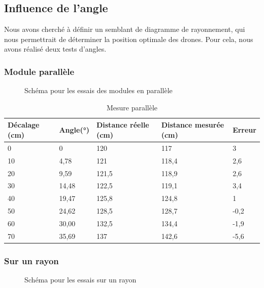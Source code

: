 \documentclass[11pt,a4paper]{article}
\begin{document}
\subsection{Influence de l'angle}
Nous avons cherché à définir un semblant de diagramme de rayonnement, qui nous permettrait de déterminer la position optimale des drones. Pour cela, nous avons réalisé deux tests d'angles.

\subsubsection{Module parallèle}
\begin{figure}[H]
  \centering
  \SchemaParalleles
  \caption{Schéma pour les essais des modules en parallèle}
\end{figure}

\begin{table}[H]
    \centering
    \begin{tabular}{|l|l|l|l|l|}
    \hline
        Décalage (cm) & Angle(°) & Distance réelle (cm) & Distance mesurée (cm) & Erreur  \\ \hline
        0 & 0 & 120 & 117 & 3 \\ \hline
        10 & 4,78 & 121 & 118,4 & 2,6 \\ \hline
        20 & 9,59 & 121,5 & 118,9 & 2,6 \\ \hline
        30 & 14,48 & 122,5 & 119,1 & 3,4 \\ \hline
        40 & 19,47 & 125,8 & 124,8 & 1 \\ \hline
        50 & 24,62 & 128,5 & 128,7 & -0,2 \\ \hline
        60 & 30,00 & 132,5 & 134,4 & -1,9 \\ \hline
        70 & 35,69 & 137 & 142,6 & -5,6 \\ \hline
    \end{tabular}
    \caption{Mesure parallèle}
\end{table}

\subsubsection{Sur un rayon}
\begin{figure}[H]
  \centering
  \Schemarayon
  \caption{Schéma pour les essais sur un rayon}
\end{figure}
\end{document}
